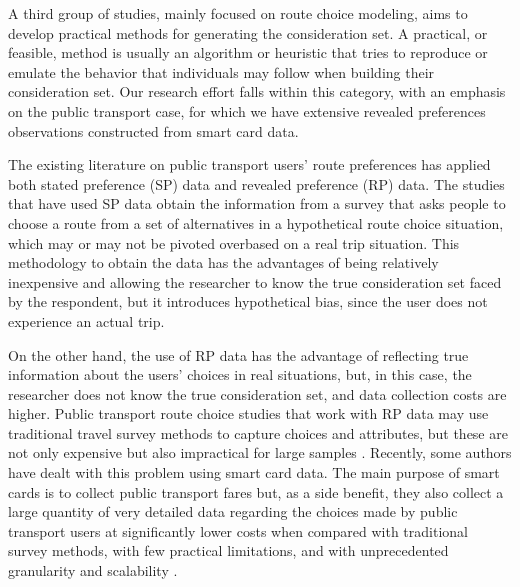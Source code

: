 \documentclass[12pt,a4paper]{article}
\begin{document}
A third group of studies, mainly focused on route choice modeling, aims to develop practical methods for generating the consideration set. A practical, or feasible, method is usually an algorithm or heuristic that tries to reproduce or emulate the behavior that individuals may follow when building their consideration set. Our research effort falls within this category, with an emphasis on the public transport  case, for which we have extensive revealed preferences observations constructed from smart card data.

The existing literature on public transport users’ route preferences has applied both stated preference (SP) data and revealed preference (RP) data. The studies that have used SP data \citep[e.g.][]{eluru2012travel, grison2017users, vrtic2002impact} obtain the information from a survey that asks people to choose a route from a set of alternatives in a hypothetical route choice situation, which may or may not be pivoted overbased on  a real trip situation. This methodology to obtain the data has the advantages of being relatively inexpensive and allowing the researcher to know the true consideration set faced by the respondent, but it introduces hypothetical bias, since the user does not experience an actual trip.

On the other hand, the use of RP data has the advantage of reflecting true information about the users’ choices in real situations, but, in this case, the researcher does not know the true consideration set, and data collection costs are higher. Public transport route choice studies that work with RP data may use traditional travel survey methods to capture choices and attributes, but these are not only expensive but also impractical for large samples \citep{guo2011mind,guo2011assessing, raveau2011topological, raveau2014behavioural, raveau2014analyzing, ton2020understanding, vrtic2002impact}. Recently, some authors have dealt with this problem using smart card data. The main purpose of smart cards is to collect public transport fares but, as a side benefit, they also collect a large quantity of very detailed data regarding the choices made by public transport users at significantly lower costs when compared with traditional survey methods, with few practical limitations, and with unprecedented granularity and scalability \citep{pelletier2011smart}.
\end{document}

